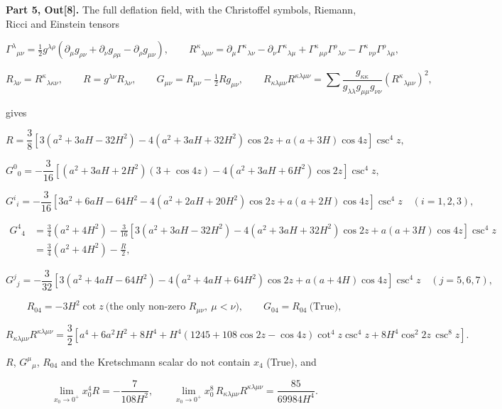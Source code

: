 \documentclass[10pt]{article}
\makeatletter
\newcommand\keepnext{\par\nopagebreak\@nobreaktrue\everypar{\@nobreakfalse\everypar{}}}
\makeatother
\begin{document}
\textbf{Part 5, Out[8].} The full deflation field, with the Christoffel symbols, Riemann, Ricci and Einstein tensors\keepnext


\[
\Gamma^\lambda{}_{\mu\nu} = \tfrac12 g^{\lambda\rho}(\partial_\mu g_{\rho\nu} + \partial_\nu g_{\rho\mu} - \partial_\rho g_{\mu\nu}), \qquad R^\kappa{}_{\lambda\mu\nu} = \partial_\mu\Gamma^\kappa{}_{\lambda\nu} - \partial_\nu\Gamma^\kappa{}_{\lambda\mu} + \Gamma^\kappa{}_{\mu\rho}\Gamma^\rho{}_{\lambda\nu} - \Gamma^\kappa{}_{\nu\rho}\Gamma^\rho{}_{\lambda\mu},
\]

\[
R_{\lambda\nu} = R^\kappa{}_{\lambda\kappa\nu}, \qquad R = g^{\lambda\nu}R_{\lambda\nu}, \qquad G_{\mu\nu} = R_{\mu\nu} - \tfrac12Rg_{\mu\nu}, \qquad R_{\kappa\lambda\mu\nu}R^{\kappa\lambda\mu\nu} = \sum \frac{g_{\kappa\kappa}}{g_{\lambda\lambda}g_{\mu\mu}g_{\nu\nu}}(R^\kappa{}_{\lambda\mu\nu})^2 ,
\]

gives\keepnext


\[
R = \frac38\left[3(a^2 + 3aH - 32H^2) - 4(a^2 + 3aH + 32H^2)\cos 2z + a(a + 3H)\cos 4z\right]\csc^4 z ,
\]

\[
G^0{}_0 = -\frac3{16}\left[(a^2 + 3aH + 2H^2)(3 + \cos 4z) - 4(a^2 + 3aH + 6H^2)\cos 2z\right]\csc^4 z ,
\]

\[
G^i{}_i = -\frac3{16}\left[3a^2 + 6aH - 64H^2 - 4(a^2 + 2aH + 20H^2)\cos 2z + a(a + 2H)\cos 4z\right]\csc^4 z \quad (i = 1, 2, 3),
\]

\[
\begin{aligned}
G^4{}_4 &= \frac34(a^2 + 4H^2) - \frac3{16}\left[3(a^2 + 3aH - 32H^2) - 4(a^2 + 3aH + 32H^2)\cos 2z + a(a + 3H)\cos 4z\right]\csc^4 z \\
&= \frac34(a^2 + 4H^2) - \frac R2 ,
\end{aligned}
\]

\[
G^j{}_j = -\frac3{32}\left[3(a^2 + 4aH - 64H^2) - 4(a^2 + 4aH + 64H^2)\cos 2z + a(a + 4H)\cos 4z\right]\csc^4 z \quad (j = 5, 6, 7),
\]

\[
R_{04} = -3H^2\cot z \ \text{(the only non-zero } R_{\mu\nu},\ \mu < \nu\text{)}, \qquad G_{04} = R_{04}\ \text{(True)},
\]

\[
R_{\kappa\lambda\mu\nu}R^{\kappa\lambda\mu\nu} = \frac32\left[a^4 + 6a^2H^2 + 8H^4 + H^4(1245 + 108\cos 2z - \cos 4z)\cot^4 z\csc^4 z + 8H^4\cos^2 2z\,\csc^8 z\right].
\]

$R$, $G^\mu{}_\mu$, $R_{04}$ and the Kretschmann scalar do not contain $x_4$ (True), and\keepnext


\[
\lim_{x_0 \to 0^+} x_0^4R = -\frac{7}{108H^2}, \qquad \lim_{x_0 \to 0^+} x_0^8\,R_{\kappa\lambda\mu\nu}R^{\kappa\lambda\mu\nu} = \frac{85}{69984H^4} .
\]
\end{document}
